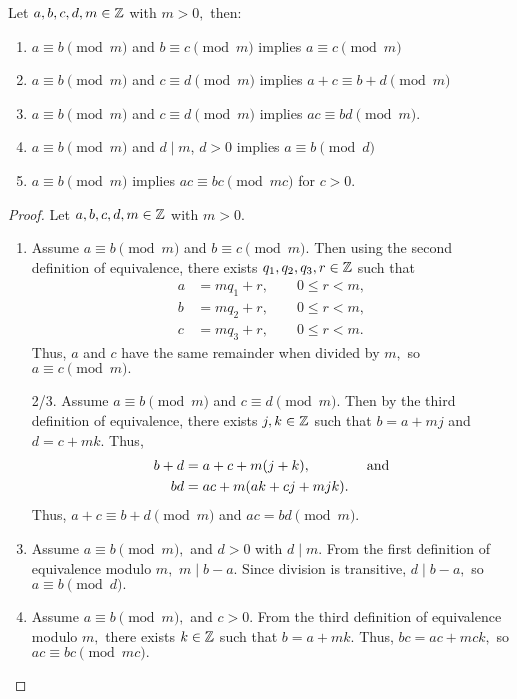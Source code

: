 \documentclass[letterpaper, 11 pt]{ximera}
\begin{document}
\begin{proposition}\label{prop:equiv-arith}
 Let $a,b,c,d,m\in\mathbb Z$ with $m>0,$ then:
\begin{enumerate}
\item $a\equiv b \pmod{m}$ and $b\equiv c \pmod{m}$ implies $a\equiv c \pmod{m}$
\item\label{equiv-add} $a\equiv b \pmod{m}$ and $c\equiv d \pmod{m}$ implies $a+c \equiv b+d \pmod{m}$ 
\item\label{equiv-multiply} $a\equiv b\pmod{m}$ and $c\equiv d \pmod{m}$ implies $ac\equiv bd \pmod{m}$.
\item $a\equiv b \pmod{m}$ and $d\mid m$, $d>0$ implies $a\equiv b \pmod{d}$
\item\label{equiv-upmod} $a\equiv b \pmod{m}$ implies $ac\equiv bc \pmod{mc}$ for $c>0$.
\end{enumerate}
\end{proposition}
\begin{proof}
  Let $a,b,c,d,m\in\mathbb Z$ with $m>0.$
  
\begin{enumerate}
 \item Assume $a\equiv b \pmod{m}$ and $b\equiv c \pmod{m}.$ Then using the second definition of equivalence, there exists $q_1,q_2,q_3,r\in\mathbb Z$ such that 
\begin{align*}
 a&=mq_1+r, \qquad 0\leq r<m,\\
 b&=mq_2+r, \qquad 0\leq r<m,\\
 c&=mq_3+r, \qquad 0\leq r<m. 
\end{align*}
Thus, $a$ and $c$ have the same remainder when divided by $m,$ so $a\equiv c\pmod m.$

\item[2/3.] Assume $a\equiv b \pmod{m}$ and $c\equiv d \pmod{m}.$ Then by the third definition of equivalence, there exists $j,k\in\mathbb Z$ such that $b=a+mj$ and $d=c+mk.$ Thus, 
\begin{align*}
 b+d&=a+c+m(j+k), \qquad\qquad\textnormal{and}\\
 bd &= ac+m(ak+cj+mjk).
\end{align*}
Thus, $a+c\equiv b+d\pmod m$ and $ac=bd\pmod m.$

\setcounter{enumi}{3}
\item Assume $a\equiv b \pmod{m},$ and $d>0$ with $d\mid m.$ From the first definition of equivalence modulo $m,$ $m\mid b-a$. Since division is transitive, $d\mid b-a,$ so $a\equiv b\pmod d.$

\item Assume $a\equiv b \pmod{m},$ and $c>0.$ From the third definition of equivalence modulo $m,$ there exists $k\in\mathbb Z$ such that $b=a+mk.$ Thus, $bc=ac+mck,$ so $ac\equiv bc \pmod{mc}.$ \qedhere
\end{enumerate}
\end{proof}
\end{document}
